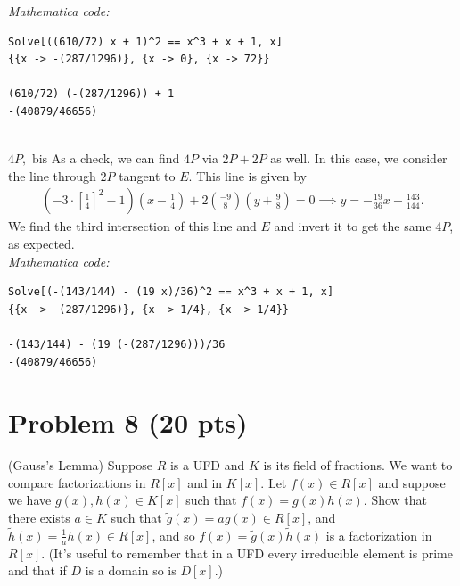 \documentclass[12pt]{article}
\newcommand{\f}[2]{\frac{#1}{#2}}
\newcommand{\lp}{\left(}
\newcommand{\rp}{\right)}
\newcommand{\lb}{\left[}
\newcommand{\rb}{\right]}
\begin{document}
\textit{Mathematica code:}
\begin{lstlisting}
Solve[((610/72) x + 1)^2 == x^3 + x + 1, x]
{{x -> -(287/1296)}, {x -> 0}, {x -> 72}}

(610/72) (-(287/1296)) + 1
-(40879/46656)
\end{lstlisting}


$\,$\\

\noindent $\boxed{4P, \text{ bis}}$ As a check, we can find $4P$ via $2P + 2P$ as well. In this case, we consider the line through $2P$ tangent to $E$. This line is given by
\begin{align}
\lp -3 \cdot \lb \f{1}{4} \rb^2 - 1 \rp \lp x - \f{1}{4} \rp + 2\lp\f{-9}{8}\rp\lp y + \f{9}{8} \rp = 0 \implies y = -\f{19}{36}x - \f{143}{144}.
\end{align}
We find the third intersection of this line and $E$ and invert it to get the same $4P$, as expected. \\

\noindent \textit{Mathematica code:}
\begin{lstlisting}
Solve[(-(143/144) - (19 x)/36)^2 == x^3 + x + 1, x]
{{x -> -(287/1296)}, {x -> 1/4}, {x -> 1/4}}

-(143/144) - (19 (-(287/1296)))/36
-(40879/46656)
\end{lstlisting}  







































\newpage


\section*{Problem 8 \small{(20 pts)}}
(Gauss's Lemma) Suppose $R$ is a UFD and $K$ is its field of fractions. We want to compare factorizations in $R[x]$ and in $K[x]$. Let $f(x)\in R[x]$ and suppose we have $g(x), h(x) \in K[x]$ such that $f(x) = g(x)h(x)$. Show that there exists $a\in K$ such that $\tilde g(x)=  ag(x) \in R[x]$, and $\tilde h(x) = \f{1}{a}h(x) \in R[x]$, and so $f(x) = \tilde g(x) \tilde h(x)$ is a factorization in $R[x]$. (It's useful to remember that in a UFD every irreducible element is prime and that if $D$ is a domain so is $D[x]$.) \\
\end{document}
